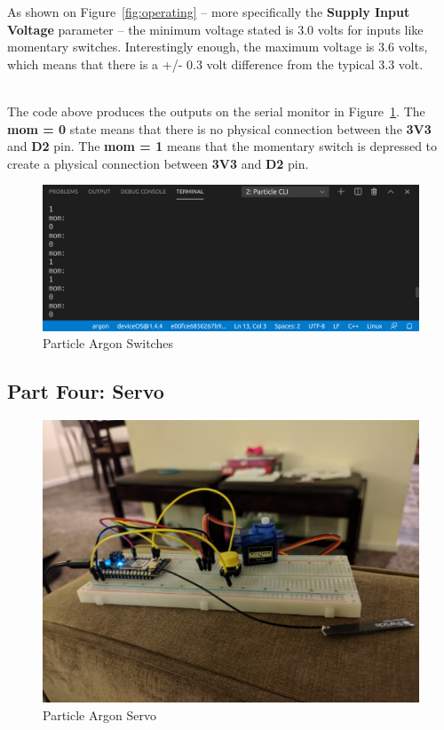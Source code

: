 \documentclass{article}
\begin{document}
As shown on Figure~\ref{fig:operating} -- more specifically the \textbf{Supply Input Voltage} parameter -- the minimum voltage stated is 3.0 volts for inputs like momentary switches. Interestingly enough, the maximum voltage is 3.6 volts, which means that there is a +/- 0.3 volt difference from the typical 3.3 volt.\\

\begin{minipage}[c]{\textwidth}

\end{minipage}\ \\

The code above produces the outputs on the serial monitor in Figure~\ref{fig:mom}. The \textbf{mom = 0} state means that there is no physical connection between the \textbf{3V3} and \textbf{D2} pin. The \textbf{mom = 1} means that the momentary switch is depressed to create a physical connection between \textbf{3V3} and \textbf{D2} pin.

\begin{figure}[H]
\center
\includegraphics[width=\textwidth]{images/mom.png}
\caption{Particle Argon Switches}
\label{fig:mom}
\end{figure}

\subsection{Part Four: Servo}
\begin{figure}[H]
\center
\includegraphics[width=\textwidth]{images/servo.jpeg}
\caption{Particle Argon Servo}
\label{fig:servo}
\end{figure}
\end{document}
